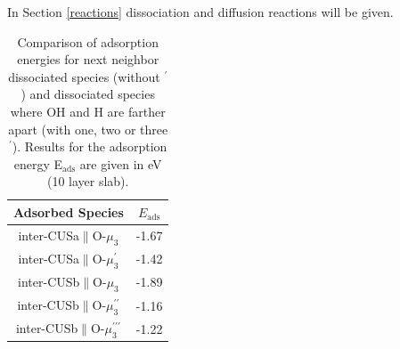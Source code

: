 \documentclass[11pt,DIV=13,BCOR=5mm,a4paper,headinclude]{scrbook}
\begin{document}
In Section \ref{reactions} dissociation and diffusion reactions will be given.
\begin{table}[!ht]
  \centering
 \caption{Comparison of adsorption energies for next neighbor dissociated species (without $^\prime$) and dissociated species where OH and H are farther apart (with one, two or three $^\prime$). 
Results for the adsorption energy E$_\textrm{ads}$ are given in eV (10 layer slab).
\vspace*{.2cm} 
  }
  \begin{tabular}{cc}
  \toprule
  Adsorbed Species  & $E_\text{ads}$  \\\midrule
   inter-CUSa$\parallel$O-$\mu_3$ & -1.67 \\
   inter-CUSa$\parallel$O-$\mu_3^\prime$ & -1.42 \\\hline
   inter-CUSb$\parallel$O-$\mu_3$ & -1.89\\
   inter-CUSb$\parallel$O-$\mu_3^{\prime\prime}$ & -1.16\\
   inter-CUSb$\parallel$O-$\mu_3^{\prime\prime\prime}$ & -1.22\\\bottomrule
  \end{tabular}
  \label{tab:ads_1waterfurther}
\end{table}
\end{document}
